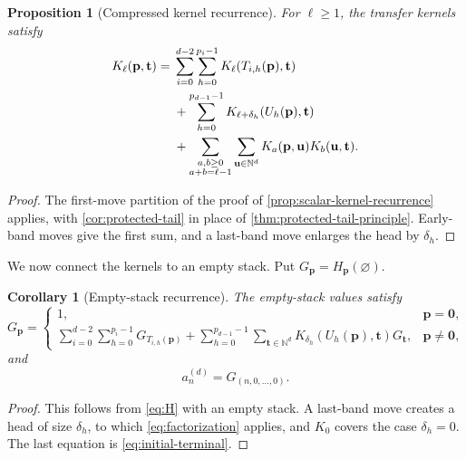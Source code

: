 \documentclass[11pt,reqno]{amsart}
\newtheorem{proposition}[proposition]{Proposition}
\newtheorem{corollary}[corollary]{Corollary}
\theoremstyle{definition}
\theoremstyle{remark}
\newcommand{\N}{\mathbb N}
\begin{document}
\begin{proposition}[Compressed kernel recurrence]
\label{prop:kernel-recurrence}
For $\ell\geq1$, the transfer kernels satisfy
\begin{align}
K_\ell(\mathbf p,\mathbf t)={}&
 \sum_{i=0}^{d-2}\sum_{h=0}^{p_i-1}
 K_\ell(T_{i,h}(\mathbf p),\mathbf t)                               \label{eq:K}\\
&+\sum_{h=0}^{p_{d-1}-1}
 K_{\ell+\delta_h}(U_h(\mathbf p),\mathbf t)                        \notag\\
&+\sum_{\substack{a,b\geq0\\a+b=\ell-1}}
  \sum_{\mathbf u\in\N^d}K_a(\mathbf p,\mathbf u)
  K_b(\mathbf u,\mathbf t).                                         \notag
\end{align}
\end{proposition}

\begin{proof}
The first-move partition of the proof of \cref{prop:scalar-kernel-recurrence}
applies, with \cref{cor:protected-tail} in place of
\cref{thm:protected-tail-principle}.  Early-band moves give the first sum,
and a last-band move enlarges the head by $\delta_h$.
\end{proof}

We now connect the kernels to an empty stack.  Put
$G_{\mathbf p}=H_{\mathbf p}(\varnothing)$.

\begin{corollary}[Empty-stack recurrence]\label{cor:empty-stack-recurrence}
The empty-stack values satisfy
\begin{equation}\label{eq:G}
G_{\mathbf p}=
\begin{cases}
 1,&\mathbf p=\mathbf0,\\[2pt]
 \displaystyle\sum_{i=0}^{d-2}\sum_{h=0}^{p_i-1}G_{T_{i,h}(\mathbf p)}
 +\sum_{h=0}^{p_{d-1}-1}\sum_{\mathbf t\in\N^d}
 K_{\delta_h}(U_h(\mathbf p),\mathbf t)G_{\mathbf t},&\mathbf p\ne\mathbf0,
\end{cases}
\end{equation}
and
\begin{equation}\label{eq:answer-G}
 a_n^{(d)}=G_{(n,0,\ldots,0)}.
\end{equation}
\end{corollary}

\begin{proof}
This follows from \eqref{eq:H} with an empty stack.  A last-band move creates
a head of size $\delta_h$, to which \eqref{eq:factorization} applies, and
$K_0$ covers the case $\delta_h=0$.  The last equation is
\eqref{eq:initial-terminal}.
\end{proof}
\end{document}
